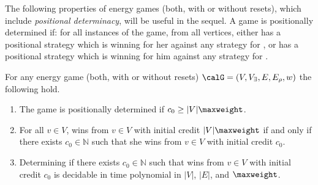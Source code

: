 \documentclass[a4paper]{article}
\begin{document}
The following properties of energy games (both, with or without resets), which
include \emph{positional determinacy}, will be useful in the sequel. A game is
positionally determined if: for all instances of the game, from all
vertices, either \eve has a positional strategy which is winning for her against
any strategy for \adam, or \adam has a positional strategy which is winning for
him against any strategy for \eve.

\begin{proposition}\label{pro:eg-props}
	For any energy game (both, with or without resets)
	$\calG = (V,V_\exists,E,E_\rho,w)$ the following hold.
	\begin{enumerate}[nolistsep]
		\item\label{itm:pos-det} The game is positionally
			determined if $c_0 \ge |V|\maxweight$.
		\item\label{itm:any-ic} For all $v \in V$, \eve wins from $v \in
			V$ with initial credit $|V|\maxweight$ if and only if
			there exists $c_0 \in \mathbb{N}$ such that she wins
			from $v \in V$ with initial credit $c_0$.
		\item Determining if there exists $c_0 \in \mathbb{N}$ such that
			\eve wins from $v \in V$ with initial credit $c_0$
			is decidable in time polynomial in $|V|$, $|E|$, and
			$\maxweight$.
	\end{enumerate}
\end{proposition}
\end{document}
